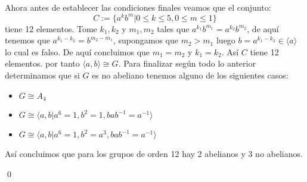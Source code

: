 \begin{homeworkProblem}
\begin{solucion}
\begin{itemize}
    \end{itemize}
    Ahora antes de establecer las condiciones finales veamos que el conjunto:
    $$C:=\{a^kb^m|0\leq k\leq 5,0\leq m\leq 1\}$$
    tiene 12 elementos. Tome $k_1,k_2$ y $m_1,m_2$ tales que $a^{k_1}b^{m_1}=a^{k_2}b^{m_2}$, de aquí tenemos que $a^{k_1-k_2}=b^{m_2-m_1}$, supongamos que $m_2>m_1$ luego $b=a^{k_1-k_2}\in\langle a\rangle$ lo cual es falso. De aquí concluimos que $m_1=m_2$ y $k_1=k_2$. Así $C$ tiene 12 elementos. por tanto $\langle a,b\rangle\cong G$. Para finalizar según todo lo anterior determinamos que si $G$ es no abeliano tenemos alguno de los siguientes casos:
    \begin{itemize}
        \item $G\cong A_4$
        \item $G\cong\langle a,b | a^6=1, b^2=1, bab^{-1}=a^{-1}\rangle$
        \item $G\cong\langle a,b | a^6=1, b^2=a^3, bab^{-1}=a^{-1}\rangle$
    \end{itemize}
    Así concluimos que para los grupos de orden 12 hay 2 abelianos y 3 no abelianos.

    \qed
    \end{solucion}
\end{homeworkProblem}

